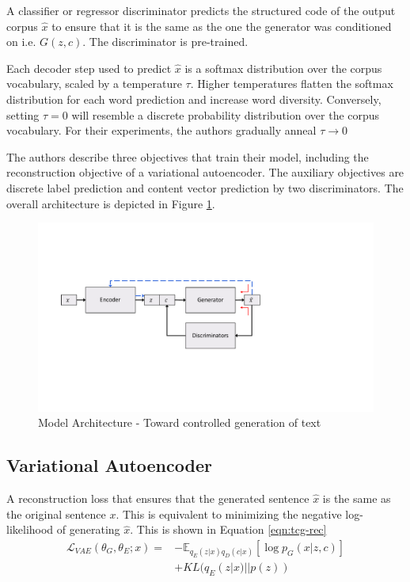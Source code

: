 A classifier or regressor discriminator predicts the structured code of the output corpus $\hat{x}$ to ensure that it is the same as the one the generator was conditioned on i.e. $G(z, c)$. The discriminator is pre-trained.

Each decoder step used to predict $\hat{x}$ is a softmax distribution over the corpus vocabulary, scaled by a temperature $\tau$. Higher temperatures flatten the softmax distribution for each word prediction and increase word diversity. Conversely, setting $\tau = 0$ will resemble a discrete probability distribution over the corpus vocabulary. For their experiments, the authors gradually anneal $\tau \rightarrow 0$

The authors describe three objectives that train their model, including the reconstruction objective of a variational autoencoder. The auxiliary objectives are discrete label prediction and content vector prediction by two discriminators. The overall architecture is depicted in Figure \ref{fig:tcg-architecture}.

\begin{figure}[ht]
	\centering
	\includegraphics[width=\textwidth]{images/tcg-architecture}
	\caption{\label{fig:tcg-architecture} Model Architecture - Toward controlled generation of text}
\end{figure}

\subsection{Variational Autoencoder}

A reconstruction loss that ensures that the generated sentence $\hat{x}$ is the same as the original sentence $x$. This is equivalent to minimizing the negative log-likelihood of generating $\hat{x}$. This is shown in Equation \ref{eqn:tcg-rec}
\begin{align} \label{eqn:tcg-rec}
	\mathcal{L}_{VAE}(\theta_G, \theta_E; x) = &
	- \mathbb{E}_{q_E(z|x)q_D(c|x)}[\log p_G(x|z,c)]  \nonumber \\ &
	+ KL(q_E(z|x)||p(z))
\end{align}


